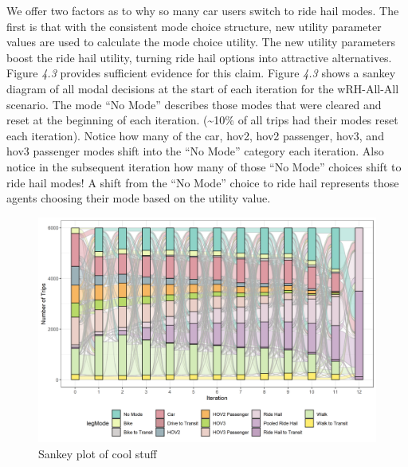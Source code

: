 \documentclass[12pt, oneside, openright]{byuthesis}
\begin{document}
We offer two factors as to why so many car users switch to ride hail modes. The first is that with the consistent mode choice structure, new utility parameter values are used to calculate the mode choice utility. The new utility parameters boost the ride hail utility, turning ride hail options into attractive alternatives. Figure \emph{4.3} provides sufficient evidence for this claim. Figure \emph{4.3} shows a sankey diagram of all modal decisions at the start of each iteration for the wRH-All-All scenario. The mode ``No Mode'' describes those modes that were cleared and reset at the beginning of each iteration. (\textasciitilde10\% of all trips had their modes reset each iteration). Notice how many of the car, hov2, hov2 passenger, hov3, and hov3 passenger modes shift into the ``No Mode'' category each iteration. Also notice in the subsequent iteration how many of those ``No Mode'' choices shift to ride hail modes! A shift from the ``No Mode'' choice to ride hail represents those agents choosing their mode based on the utility value.

\begin{landscape}

\begin{figure}[H]
\centering
\includegraphics{planshifts.png}
\caption{Sankey plot of cool stuff}
\end{figure}

\end{landscape}
\end{document}
